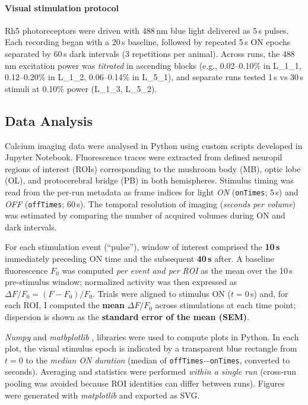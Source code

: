     \paragraph{Visual stimulation protocol}
    Rh5 photoreceptors were driven with 488\,nm blue light delivered as 5\,s pulses. Each recording began with a 20\,s baseline, followed by repeated 5\,s ON epochs separated by 60\,s dark intervals (3 repetitions per animal). Across runs, the 488\,nm excitation power was \emph{titrated} in ascending blocks (e.g., 0.02–0.10\% in L\_1\_1, 0.12–0.20\% in L\_1\_2, 0.06–0.14\% in L\_5\_1), and separate runs tested 1\,s vs 30\,s stimuli at 0.10\% power (L\_1\_3, L\_5\_2). 

    
    \subsection{Data Analysis}

    Calcium imaging data were analysed in Python using custom scripts developed in Jupyter Notebook. Fluorescence traces were extracted from defined neuropil regions of interest (ROIs) corresponding to the mushroom body (MB), optic lobe (OL), and protocerebral bridge (PB) in both hemispheres. Stimulus timing was read from the per-run metadata as frame indices for light \emph{ON} (\texttt{onTimes}; 5\,s) and \emph{OFF} (\texttt{offTimes}; 60\,s). The temporal resolution of imaging (\emph{seconds per volume}) was estimated by comparing the number of acquired volumes during ON and dark intervals.

    For each stimulation event (“pulse”),  window of interest comprised the \textbf{10\,s} immediately preceding ON time and the subsequent \textbf{40\,s} after. A baseline fluorescence $F_{0}$ was computed \emph{per event and per ROI} as the mean over the 10\,s pre-stimulus window; normalized activity was then expressed as $\Delta F/F_{0} = (F - F_{0})/F_{0}$. Trials were aligned to stimulus ON ($t=0$\,s) and, for each ROI, I computed the \textbf{mean} $\Delta F/F_{0}$ across stimulations at each time point; dispersion is shown as the \textbf{standard error of the mean (SEM)}. 

    \textit{Numpy} \citep{unpingco2021numpy} and \textit{matbplotlib} \citep{hunter2007matplotlib}, libraries were used to compute plots in Python. 
    In each plot, the visual stimulus epoch is indicated by a transparent blue rectangle from $t=0$ to the \emph{median ON duration} (median of \texttt{offTimes}$-$\texttt{onTimes}, converted to seconds). Averaging and statistics were performed \emph{within a single run} (cross-run pooling was avoided because ROI identities can differ between runs). Figures were generated with \textit{matplotlib} and exported as SVG.
